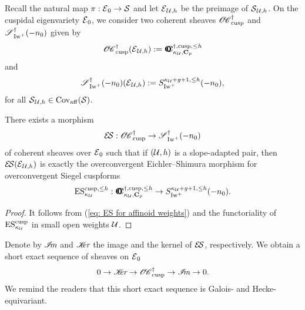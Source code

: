 Recall the natural map $\pi:\calE_0\rightarrow\calS$ and let $\calE_{\calU, h}$ be the preimage of $\calS_{\calU, h}$. On the cuspidal eigenvariety $\calE_0$, we consider two coherent sheaves $\sheafOC^{\dagger}_{\cusp}$ and $\scrS_{\Iw^+}^{\dagger}(-n_0)$ given by 
$$
    \sheafOC^{\dagger}_{\cusp}(\calE_{\calU, h}):=\OC_{\kappa_{\calU}, \C_p}^{\dagger, \cusp, \leq h}
    $$
and    
$$\scrS_{\Iw^+}^{\dagger}(-n_0)(\calE_{\calU, h}):= S_{\Iw^+}^{\kappa_{\calU}+g+1, \leq h}(-n_0),
$$
for all $\calS_{\calU, h}\in \Cov_{\mathrm{aff}}(\calS)$. 

\begin{Theorem}\label{Theorem: OES over the eigenvariety}
There exists a morphism \[
    \EScal: \sheafOC_{\cusp}^{\dagger}\rightarrow \scrS_{\Iw^+}^{\dagger}(-n_0)
\] of coherent sheaves over $\calE_0$ such that if $(\calU, h)$ is a slope-adapted pair, then $\EScal(\calE_{\calU, h})$ is exactly the overconvergent Eichler--Shimura morphism for overconvergent Siegel cuspforms \[
    \ES_{\kappa_{\calU}}^{\cusp, \leq h}: \OC_{\kappa_{\calU}, \C_p}^{\dagger, \cusp, \leq h} \rightarrow S_{\Iw^+}^{\kappa_{\calU}+g+1, \leq h}(-n_0).
\]
\end{Theorem}
\begin{proof}
It follows from (\ref{eq: ES for affinoid weights}) and the functoriality of $\ES_{\kappa_{\calU}}^{\cusp}$ in small open weights $\calU$.
\end{proof}

Denote by $\sheafIm$ and $\sheafKer$ the image and the kernel of $\EScal$, respectively. We obtain a short exact sequence of sheaves on $\calE_0$ $$0\rightarrow \sheafKer\rightarrow \sheafOC_{\cusp}^{\dagger}\rightarrow \sheafIm\rightarrow 0.$$ We remind the readers that this short exact sequence is Galois- and Hecke-equivariant. 

